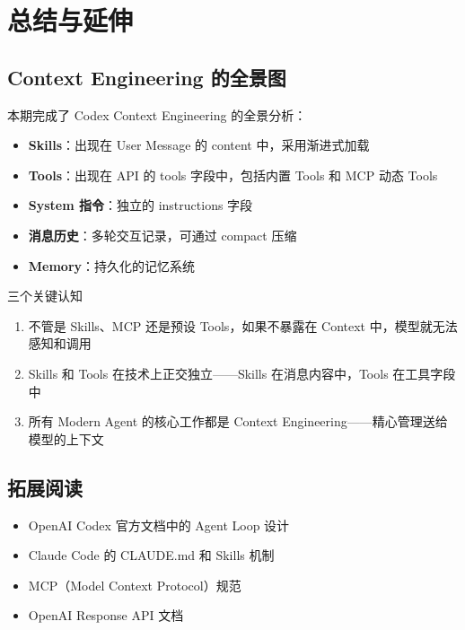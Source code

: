 \section{总结与延伸}

\subsection{Context Engineering 的全景图}

本期完成了 Codex Context Engineering 的全景分析：

\begin{itemize}
    \item \textbf{Skills}：出现在 User Message 的 content 中，采用渐进式加载
    \item \textbf{Tools}：出现在 API 的 tools 字段中，包括内置 Tools 和 MCP 动态 Tools
    \item \textbf{System 指令}：独立的 instructions 字段
    \item \textbf{消息历史}：多轮交互记录，可通过 compact 压缩
    \item \textbf{Memory}：持久化的记忆系统
\end{itemize}

\begin{importantbox}{三个关键认知}
\begin{enumerate}
    \item 不管是 Skills、MCP 还是预设 Tools，如果不暴露在 Context 中，模型就无法感知和调用
    \item Skills 和 Tools 在技术上正交独立——Skills 在消息内容中，Tools 在工具字段中
    \item 所有 Modern Agent 的核心工作都是 Context Engineering——精心管理送给模型的上下文
\end{enumerate}
\end{importantbox}

\subsection{拓展阅读}

\begin{itemize}
    \item OpenAI Codex 官方文档中的 Agent Loop 设计
    \item Claude Code 的 CLAUDE.md 和 Skills 机制
    \item MCP（Model Context Protocol）规范
    \item OpenAI Response API 文档
\end{itemize}



